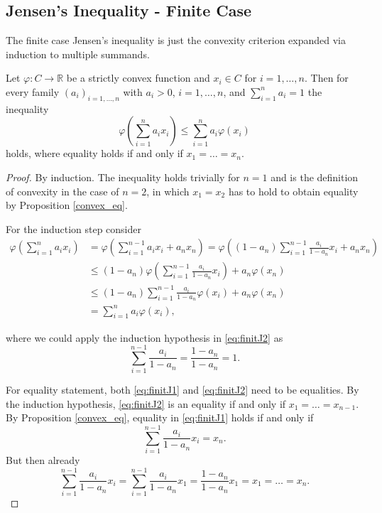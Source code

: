 
\subsection{Jensen's Inequality - Finite Case}

The finite case Jensen's inequality is just the convexity criterion expanded via induction to multiple summands.
 
\begin{proposition}\label{th:finite_jensen}
  Let $\varphi: C \to \mathbb{R}$ be a strictly convex function and $x_i \in C$ for $i=1,\dots,n$. Then for every family $(a_i)_{i=1,...,n}$ with $a_i > 0$, $i=1,\dots,n$, and $\sum_{i=1}^{n} a_i = 1$ the inequality
  \[
  \varphi\left(\sum_{i=1}^{n} a_i x_i\right) \leq \sum_{i=1}^{n} a_i \varphi(x_i)
  \]
  holds, where equality holds if and only if $x_1 = \ldots = x_n$.
\end{proposition}

\begin{proof}
  By induction. The inequality holds trivially for $n=1$ and is the definition of convexity in the case of $n=2$, in which $x_1 = x_2$ has to hold to obtain equality by Proposition \ref{convex_eq}.

  For the induction step consider
  \begin{align}
    \varphi\left(\sum_{i=1}^{n} a_i x_i\right) &= \varphi\left( \sum_{i=1}^{n-1} a_ix_i + a_n x_n \right) = \varphi\left( (1-a_n) \sum_{i=1}^{n-1} \frac{a_i}{1-a_n}x_i + a_n x_n \right) \nonumber \\
    & \leq (1-a_n) \varphi\left( \sum_{i=1}^{n-1} \frac{a_i}{1-a_n} x_i
    \right) + a_n \varphi(x_n) \label{eq:finitJ1} \\ & \leq (1 - a_n) \sum_{i=1}^{n-1}  \frac{a_i}{1-a_n} \varphi(x_i) + a_n \varphi(x_n) \label{eq:finitJ2} \\
     &= \sum_{i=1}^{n} a_i \varphi(x_i), \nonumber
  \end{align}

  where we could apply the induction hypothesis in \ref{eq:finitJ2} as
  \[
  \sum_{i=1}^{n-1}  \frac{a_i}{1-a_n} = \frac{1-a_n}{1-a_n} = 1.
  \]

  For equality statement, both \ref{eq:finitJ1} and \ref{eq:finitJ2} need to be equalities. By the induction hypothesis, \ref{eq:finitJ2} is an equality if and only if $x_1 = \ldots = x_{n-1}$.  By Proposition \ref{convex_eq}, equality in \ref{eq:finitJ1} holds if and only if
  \[
  \sum_{i=1}^{n-1} \frac{a_i}{1-a_n} x_i = x_n.
  \]
  But then already
  \[
  \sum_{i=1}^{n-1} \frac{a_i}{1-a_n} x_i = \sum_{i=1}^{n-1} \frac{a_i}{1-a_n} x_1 = \frac{1-a_n}{1-a_n} x_1 = x_1 = \ldots = x_n.
  \]
  
\end{proof}


